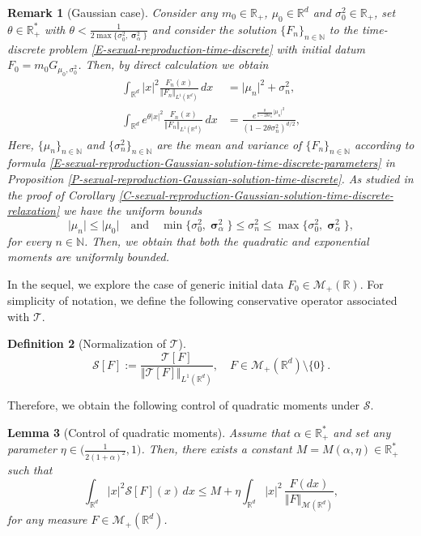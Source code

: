 \documentclass[reqno]{amsart}
\newtheorem{definition}{Definition}[section]
\newtheorem{lemma}[definition]{Lemma}
\newtheorem{remark}[definition]{Remark}
\DeclareMathOperator{\bsigma}{\boldsymbol{\sigma}}
\numberwithin{equation}{section}
\begin{document}
{\begin{remark}[Gaussian case]
Consider any $m_0\in \mathbb{R}_+$, $\mu_0\in \mathbb{R}^d$ and $\sigma_0^2\in \mathbb{R}_+$, set $\theta\in \mathbb{R}_+^*$ with $\theta<\frac{1}{2\max\{\sigma_0^2,\bsigma_\alpha^2\}}$ and consider the solution $\{F_n\}_{n\in \mathbb{N}}$ to the time-discrete problem \eqref{E-sexual-reproduction-time-discrete} with initial datum $F_0=m_0G_{\mu_0,\sigma_0^2}$. Then, by direct calculation we obtain
\begin{align*}
\int_{\mathbb{R}^d}\vert x\vert^2 \frac{F_n(x)}{\Vert F_n\Vert_{L^1(\mathbb{R}^d)}}\,dx&=\vert \mu_n\vert^2+\sigma_n^2,\\
\int_{\mathbb{R}^d}e^{\theta\vert x\vert^2}\frac{F_n(x)}{\Vert F_n\Vert_{L^1(\mathbb{R}^d)}}\,dx&=\frac{e^{\frac{\theta}{1-2\theta\sigma_n^2}\vert \mu_n\vert^2}}{(1-2\theta\sigma_n^2)^{d/2}},
\end{align*}
Here, $\{\mu_n\}_{n\in \mathbb{N}}$ and $\{\sigma_n^2\}_{n\in \mathbb{N}}$ are the mean and variance of $\{F_n\}_{n\in \mathbb{N}}$ according to formula \eqref{E-sexual-reproduction-Gaussian-solution-time-discrete-parameters} in Proposition \ref{P-sexual-reproduction-Gaussian-solution-time-discrete}. As studied in the proof of Corollary \ref{C-sexual-reproduction-Gaussian-solution-time-discrete-relaxation} we have the uniform bounds
$$\vert \mu_n\vert\leq \vert \mu_0\vert \quad\mbox{and}\quad \min\{\sigma_0^2,\bsigma_\alpha^2\}\leq \sigma_n^2\leq \max\{\sigma_0^2,\bsigma_\alpha^2\},$$
for every $n\in \mathbb{N}$. Then, we obtain that both the quadratic and exponential moments are uniformly bounded.
\end{remark}

In the sequel, we explore the case of generic initial data $F_0\in \mathcal{M}_+(\mathbb{R})$. For simplicity of notation, we define the following conservative operator associated with $\mathcal{T}$.

\begin{definition}[Normalization of $\mathcal{T}$]\label{D-normalized-operator-T}
$$
\mathcal{S}[F]:=\frac{\mathcal{T}[F]}{\Vert \mathcal{T}[F]\Vert_{L^1(\mathbb{R}^d)}},\quad F\in \mathcal{M}_+(\mathbb{R}^d)\setminus \{0\}\,.
$$
\end{definition}

Therefore, we obtain the following control of quadratic moments under $\mathcal{S}$.

\begin{lemma}[Control of quadratic moments]\label{L-quadratic-moments}
Assume that $\alpha\in \mathbb{R}_+^*$ and set any parameter $\eta\in \big(\frac{1}{2(1+\alpha)^2},1\big)$. Then, there exists a constant $M=M(\alpha,\eta)\in \mathbb{R}_+^*$ such that
$$\int_{\mathbb{R}^d}\vert x\vert^2 \mathcal{S}[F](x)\,dx\leq M+\eta \int_{\mathbb{R}^d}\vert x\vert^2\,\frac{F(dx)}{\Vert F\Vert_{\mathcal{M}(\mathbb{R}^d)}},$$
for any measure $F\in \mathcal{M}_+(\mathbb{R}^d)$.
\end{lemma}

}
\end{document}
